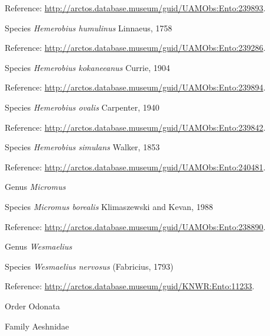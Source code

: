 \documentclass[9pt, article]{memoir}
\begin{document}
\begin{multicols}{2}
Reference: 
\url{http://arctos.database.museum/guid/UAMObs:Ento:239893}.

\vspace{6pt}\noindent\hspace{36pt}Species \textit{Hemerobius humulinus} Linnaeus, 1758


Reference: 
\url{http://arctos.database.museum/guid/UAMObs:Ento:239286}.

\vspace{6pt}\noindent\hspace{36pt}Species \textit{Hemerobius kokaneeanus} Currie, 1904


Reference: 
\url{http://arctos.database.museum/guid/UAMObs:Ento:239894}.

\vspace{6pt}\noindent\hspace{36pt}Species \textit{Hemerobius ovalis} Carpenter, 1940


Reference: 
\url{http://arctos.database.museum/guid/UAMObs:Ento:239842}.

\vspace{6pt}\noindent\hspace{36pt}Species \textit{Hemerobius simulans} Walker, 1853


Reference: 
\url{http://arctos.database.museum/guid/UAMObs:Ento:240481}.

\vspace{6pt}\noindent\hspace{30pt}Genus \textit{Micromus}


\vspace{6pt}\noindent\hspace{36pt}Species \textit{Micromus borealis} Klimaszewski and Kevan, 1988


Reference: 
\url{http://arctos.database.museum/guid/UAMObs:Ento:238890}.

\vspace{6pt}\noindent\hspace{30pt}Genus \textit{Wesmaelius}


\vspace{6pt}\noindent\hspace{36pt}Species \textit{Wesmaelius nervosus} (Fabricius, 1793)


Reference: 
\url{http://arctos.database.museum/guid/KNWR:Ento:11233}.

\vspace{6pt}\noindent\hspace{18pt}Order Odonata


\vspace{6pt}\noindent\hspace{24pt}Family Aeshnidae



\end{multicols}
\end{document}
